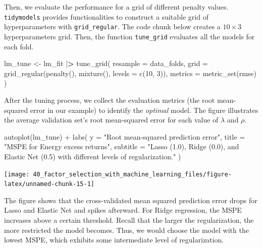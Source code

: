\documentclass[
]{krantz}
\newenvironment{Shaded}{\begin{snugshade}}{\end{snugshade}}
\newcommand{\AttributeTok}[1]{\textcolor[rgb]{0.61,0.61,0.61}{#1}}
\newcommand{\DecValTok}[1]{\textcolor[rgb]{0.06,0.06,0.06}{#1}}
\newcommand{\ErrorTok}[1]{\textcolor[rgb]{0.14,0.14,0.14}{\textbf{#1}}}
\newcommand{\FunctionTok}[1]{\textcolor[rgb]{0,0,0}{#1}}
\newcommand{\NormalTok}[1]{#1}
\newcommand{\OtherTok}[1]{\textcolor[rgb]{0.37,0.37,0.37}{#1}}
\newcommand{\SpecialCharTok}[1]{\textcolor[rgb]{0,0,0}{#1}}
\newcommand{\StringTok}[1]{\textcolor[rgb]{0.5,0.5,0.5}{#1}}
\begin{document}
Then, we evaluate the performance for a grid of different penalty values. \texttt{tidymodels} provides functionalities to construct a suitable grid of hyperparameters with \texttt{grid\_regular}. The code chunk below creates a \(10 \times 3\) hyperparameters grid. Then, the function \texttt{tune\_grid} evaluates all the models for each fold.

\begin{Shaded}
\begin{Highlighting}[]
\NormalTok{lm\_tune }\OtherTok{\textless{}{-}}\NormalTok{ lm\_fit }\SpecialCharTok{|}\ErrorTok{\textgreater{}}
  \FunctionTok{tune\_grid}\NormalTok{(}
    \AttributeTok{resample =}\NormalTok{ data\_folds,}
    \AttributeTok{grid =} \FunctionTok{grid\_regular}\NormalTok{(}\FunctionTok{penalty}\NormalTok{(), }\FunctionTok{mixture}\NormalTok{(), }\AttributeTok{levels =} \FunctionTok{c}\NormalTok{(}\DecValTok{10}\NormalTok{, }\DecValTok{3}\NormalTok{)),}
    \AttributeTok{metrics =} \FunctionTok{metric\_set}\NormalTok{(rmse)}
\NormalTok{  )}
\end{Highlighting}
\end{Shaded}

After the tuning process, we collect the evaluation metrics (the root mean-squared error in our example) to identify the \emph{optimal} model. The figure illustrates the average validation set's root mean-squared error for each value of \(\lambda\) and \(\rho\).

\begin{Shaded}
\begin{Highlighting}[]
\FunctionTok{autoplot}\NormalTok{(lm\_tune) }\SpecialCharTok{+}
  \FunctionTok{labs}\NormalTok{(}
    \AttributeTok{y =} \StringTok{"Root mean{-}squared prediction error"}\NormalTok{,}
    \AttributeTok{title =} \StringTok{"MSPE for Energy excess returns"}\NormalTok{,}
    \AttributeTok{subtitle =} \StringTok{"Lasso (1.0), Ridge (0.0), and Elastic Net (0.5) with different levels of regularization."}
\NormalTok{  )}
\end{Highlighting}
\end{Shaded}

\begin{center}\texttt{[image: 40\_factor\_selection\_with\_machine\_learning\_files/figure-latex/unnamed-chunk-15-1]} \end{center}

The figure shows that the cross-validated mean squared prediction error drops for Lasso and Elastic Net and spikes afterward. For Ridge regression, the MSPE increases above a certain threshold. Recall that the larger the regularization, the more restricted the model becomes. Thus, we would choose the model with the lowest MSPE, which exhibits some intermediate level of regularization.
\end{document}
